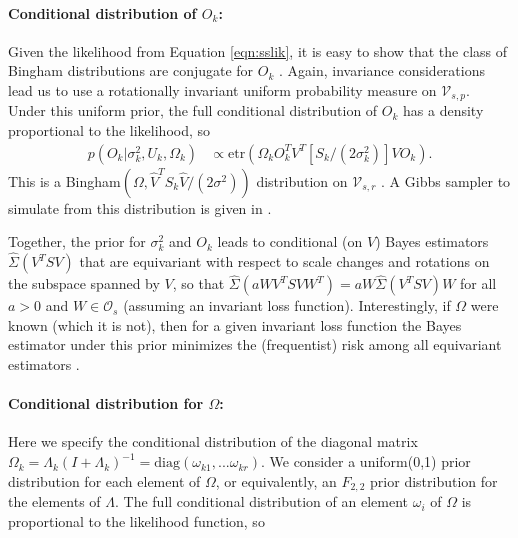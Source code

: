 \documentclass[12pt]{article}
\newcommand{\etr}{\text{etr}}
\begin{document}
\paragraph{Conditional distribution of $O_k$:} Given the likelihood
from Equation \ref{eqn:sslik}, it is easy to show that the class of
Bingham distributions are conjugate for $O_k$ \citep{Hoff2009,
  Hoff2012}.  Again, invariance considerations lead us to use a
rotationally invariant uniform probability measure on
$\mathcal V_{s,p}$.  Under this uniform prior, the full conditional
distribution of $O_k$ has a density proportional to the
likelihood, so
%
\begin{align}
\label{lik_vo}
 p(O_k | \sigma^2_k, U_k, \Omega_k) & \propto \etr(\Omega_kO^T_kV^T[S_k/(2\sigma^2_k)]VO_k).
\end{align}
%
\noindent This is a Bingham$(\Omega, \hat{V}^T S_k \hat{V}/(2\sigma^2))$
distribution on $\mathcal V_{s, r}$ \citep{Khatri1977}. A
Gibbs sampler to simulate from this distribution is given in
\citet{Hoff2012}.  

Together, the prior for $\sigma_k^2$ and $O_k$ leads to conditional
(on $V$) Bayes estimators $\hat \Sigma(V^T S V)$ that are
equivariant with respect to scale changes and rotations on the
subspace spanned by $V$, so
that $\hat \Sigma(a W V^T S V W^T) = a W \hat\Sigma(V^T
S V)  W$
for all $a>0$ and $ W\in \mathcal O_{s}$ (assuming an invariant
loss function). Interestingly, if $\Omega$ were known (which it is
not), then for a given invariant loss function the Bayes estimator
under this prior minimizes the (frequentist) risk among all
equivariant estimators \citep{Eaton1989}.

\paragraph{Conditional distribution for $\Omega$:} Here we specify the
conditional distribution of the diagonal matrix
$\Omega_k = \Lambda_k(I+\Lambda_k)^{-1} = \text{diag}(\omega_{k1},
... \omega_{kr})$.
We consider a uniform(0,1) prior distribution for each element of
$\Omega$, or equivalently, an $F_{2,2}$ prior distribution for the
elements of $\Lambda$.  The full conditional distribution of an
element $\omega_i$ of $\Omega$ is proportional to the likelihood
function, so
\end{document}
